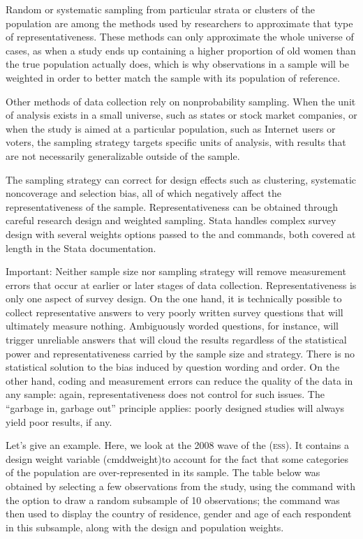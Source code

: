 \begin{itemize}
 Random or systematic sampling from particular strata or clusters of the population are among the methods used by researchers to approximate that type of representativeness. These methods can only approximate the whole universe of cases, as when a study ends up containing a higher proportion of old women than the true population actually does, which is why observations in a sample will be weighted in order to better match the sample with its population of reference.
 
 Other methods of data collection rely on nonprobability sampling. When the unit of analysis exists in a small universe, such as states or stock market companies, or when the study is aimed at a particular population, such as Internet users or voters, the sampling strategy targets specific units of analysis, with results that are not necessarily generalizable outside of the sample.
 
 The sampling strategy can correct for design effects such as clustering, systematic noncoverage and selection bias, all of which negatively affect the representativeness of the sample. Representativeness can be obtained through careful research design and weighted sampling. Stata handles complex survey design with several weights options passed to the  and  commands, both covered at length in the Stata documentation.
\end{itemize}

Important: Neither sample size nor sampling strategy will remove measurement errors that occur at earlier or later stages of data collection. Representativeness is only one aspect of survey design. On the one hand, it is technically possible to collect representative answers to very poorly written survey questions that will ultimately measure nothing. Ambiguously worded questions, for instance, will trigger unreliable answers that will cloud the results regardless of the statistical power and representativeness carried by the sample size and strategy. There is no statistical solution to the bias induced by question wording and order. On the other hand, coding and measurement errors can reduce the quality of the data in any sample: again, representativeness does not control for such issues. The \enquote{garbage in, garbage out} principle applies: poorly designed studies will always yield poor results, if any.

Let's give an example. Here, we look at the 2008 wave of the \ess (\textsc{ess}). It contains a design weight variable (cmd{dweight})to account for the fact that some categories of the population are over-represented in its sample. The table below was obtained by selecting a few observations from the study, using the  command with the  option to draw a random subsample of 10 observations; the  command was then used to display the country of residence, gender and age of each respondent in this subsample, along with the design and population weights.

